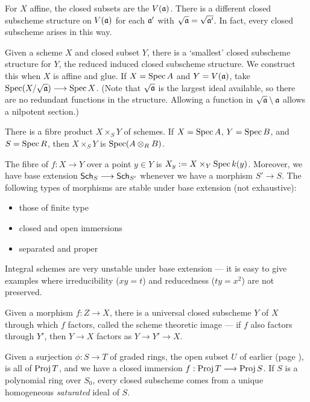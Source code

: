 \documentclass[11pt]{article}
\newcommand{\Index}[1]{\index{#1}#1}
\begin{document}
\begin{II.3 First Properties of Schemes}
\begin{itemise}
\INDENT For $X$ affine, the closed subsets are the $V(\mathfrak{a})$. There is a
different closed subscheme structure on
$V(\mathfrak{a})$ for each $\mathfrak{a}'$ with $\sqrt{\mathfrak{a}}=\sqrt{\mathfrak{a}'}$. In fact,
every closed subscheme arises in this way.
\item Given a scheme $X$ and closed subset $Y$, there is a `smallest' closed
subscheme structure for $Y$, the reduced
induced closed subscheme structure. We construct this when $X$ is affine and
glue. If $X=\operatorname{Spec} A$ and $Y=V(\mathfrak{a})$, take $\operatorname{Spec} (X/\sqrt{\mathfrak{a}})\longrightarrow\operatorname{Spec} X$.
{\small (Note that $\sqrt{\mathfrak{a}}$ is the largest ideal available, so there are no
redundant functions in the structure. Allowing a function in
$\sqrt{\mathfrak{a}}\setminus\mathfrak{a}$ allows a nilpotent section.)}
\item There is a \Index{fibre product} $X\times_SY$ of schemes. If $X=\operatorname{Spec} A$,
$Y=\operatorname{Spec} B$, and $S=\operatorname{Spec} R$, then $X\times_SY$ is $\operatorname{Spec}(A\otimes_R B)$.
\item The \Index{fibre} of $f:X\to Y$ over a point $y\in Y$ is $X_y:=X\times
_Y\operatorname{Spec} k(y)$. Moreover, we have \Index{base extension}
$\operatorname{{\mathsf{Sch}}}_S\longrightarrow\operatorname{{\mathsf{Sch}}}_{S'}$ whenever we have a morphism $S'\to S$. The
following types of morphisms are stable under base extension (not exhaustive):
\begin{itemize}\squishlist
\item those of finite type
\item closed and open immersions
\item separated and proper
\end{itemize}
\item Integral schemes are very unstable under base extension --- it is easy to
give examples where irreducibility ($xy=t$) and reducedness ($ty=x^2$) are not
preserved.
\item Given a morphism $f:Z\to X$, there is a universal closed subscheme $Y$ of
$X$ through which $f$ factors, called the scheme theoretic
image --- if $f$ also factors through $Y'$, then
$Y\to X$ factors as $Y\to Y'\to X$.
\item Given a surjection $\phi:S\to T$ of graded rings, the open subset $U$ of
earlier (page \pageref{mapsofprojs}), is all of $\operatorname{Proj} T$, and we have a closed
immersion $f:\operatorname{Proj} T\longrightarrow\operatorname{Proj} S$. If $S$ is a polynomial ring over $S_0$, every
closed subscheme comes from a unique
homogeneous \emph{saturated} ideal of $S$.

\end{itemise}
\end{II.3 First Properties of Schemes}
\end{document}
